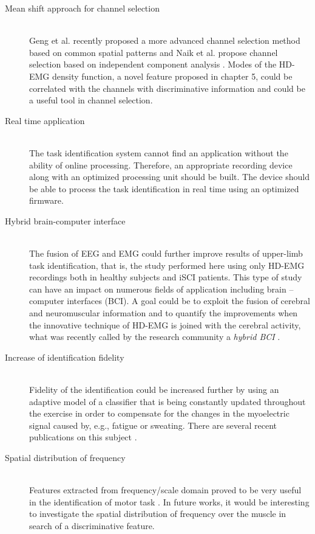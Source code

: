 \begin{description}
\item[Mean shift approach for channel selection] \hfill \\
	Geng et al. recently proposed a more advanced channel selection method based on common spatial patterns \citep{Geng2014} and Naik et al. propose channel selection based on independent component analysis \citep{Naik2016}. Modes of the HD-EMG density function, a novel feature proposed in chapter 5, could be correlated with the channels with discriminative information and could be a useful tool in channel selection.

\item[Real time application] \hfill \\
	The task identification system cannot find an application without the ability of online processing. Therefore, an appropriate recording device along with an optimized processing unit should be built. The device should be able to process the task identification in real time using an optimized firmware.

\item[Hybrid brain-computer interface] \hfill \\
	The fusion of EEG and EMG could further improve results of upper-limb task identification, that is, the study performed here using only HD-EMG recordings both in healthy subjects and iSCI patients. This type of study can have an impact on numerous fields of application including brain – computer interfaces (BCI). A goal could be to exploit the fusion of cerebral and neuromuscular information and to quantify the improvements when the innovative technique of HD-EMG is joined with the cerebral activity, what was recently called by the research community a \emph{hybrid BCI} \citep{Muller-Putz2015, Rohm2013}.

\item [Increase of identification fidelity] \hfill \\
	Fidelity of the identification could be increased further by using an adaptive model of a classifier that is being constantly updated throughout the exercise in order to compensate for the changes in the myoelectric signal caused by, e.g., fatigue or sweating. There are several recent publications on this subject \citep{Hahne2015, Vidovic2016, Sensinger2009}.

\item[Spatial distribution of frequency] \hfill \\
	Features extracted from frequency/scale domain proved to be very useful in the identification of motor task \citep{Oskoei2007}. In future works, it would be interesting to investigate the spatial distribution of frequency over the muscle in search of a discriminative feature.

\end{description}

